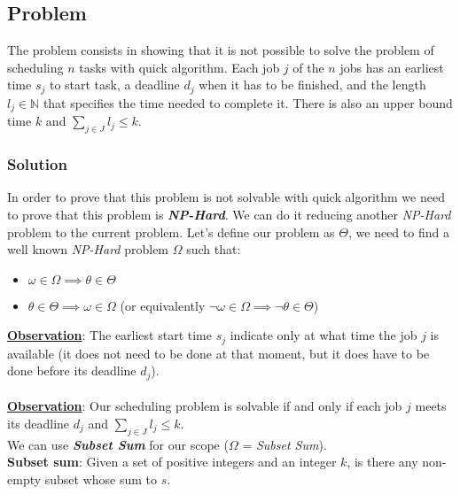 \documentclass[11pt]{article}
\begin{document}
\subsection*{Problem}
The problem consists in showing that it is not possible to solve the problem of scheduling $n$ tasks with quick algorithm. Each job  $j$ of the $n$ jobs has an earliest time $s_j$ to start task, a deadline $d_j$ when it has to be finished, and the length $l_j \in \mathbb{N}$ that specifies the time needed to complete it. There is also an upper bound time $k$ and $\sum\limits_{j \in J}l_j \le k$.
\subsubsection*{Solution}
In order to prove that this problem is not solvable with quick algorithm we need to prove that this problem is \textbf{\textit{NP-Hard}}. We can do it reducing another \textit{NP-Hard} problem to the current problem. Let's define our problem as $\Theta$, we need to find a well known \textit{NP-Hard} problem $\Omega$ such that:
\begin{itemize}
	\item $\omega \in \Omega \implies  \theta \in \Theta$
	\item $\theta \in \Theta \implies  \omega \in \Omega$ (or equivalently $\neg\omega \in \Omega \implies  \neg\theta \in \Theta$)
\end{itemize}
\textbf{\underline{Observation}}: The earliest start time  $s_j$ indicate only at what time the job $j$ is available (it does not need to be done at that moment, but it does have to be done before its deadline $d_j$). \\ \\
\textbf{\underline{Observation}}: Our scheduling problem is solvable if and only if each job $j$ meets its deadline $d_j$ and $\sum\limits_{j \in J}l_j \le k$. \\
We can use \textbf{\textit{Subset Sum}} for our scope ($\Omega$ = \textit{Subset Sum}). \\
\textbf{Subset sum}: Given a set of positive integers and an integer $k$, is there any non-empty subset whose sum to $s$.
\end{document}
